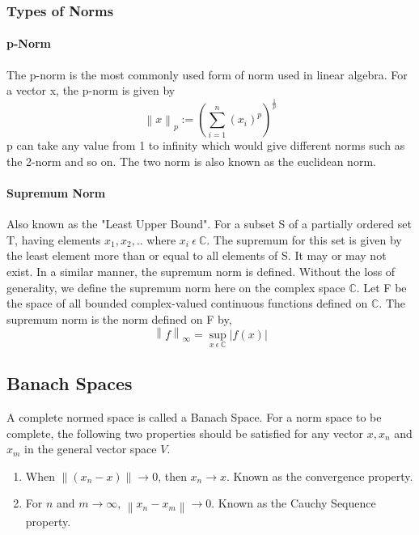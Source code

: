 \documentclass[a4paper,12pt]{article}
\newcommand\norm[1]{\left\lVert#1\right\rVert}
\begin{document}
		\subsubsection{Types of Norms}
			\paragraph{p-Norm} The p-norm is the most commonly used form of norm used in linear algebra. For a vector x, the p-norm is given by
				\begin{equation}
					\norm{x}_{p} := \left(\sum\limits_{i=1}^n  (x_{i})^{p}\right)^{\frac{1}{p}}
				\end{equation}
				p can take any value from 1 to infinity which would give different norms such as the 2-norm and so on. The two norm is also known as the euclidean norm.
			\paragraph{Supremum Norm} Also known as the "Least Upper Bound". For a subset S of a partially ordered set T, having elements ${x_{1},x_{2},..}$ where $x_{i}\:\epsilon \:\mathbb{C}$. The supremum for this set is given by the least element more than or equal to all elements of S. It may or may not exist. In a similar manner, the supremum norm is defined. Without the loss of generality, we define the supremum norm here on the complex space $\mathbb{C}$. Let F be the space of all bounded complex-valued continuous functions defined on $\mathbb{C}$. The supremum norm is the norm defined on F by,
			\begin{equation}
				\norm{f}_{\infty}=\sup_{x\: \epsilon \:\mathbb{C}} |f(x)|
			\end{equation}
		
	\subsection{Banach Spaces}
	A complete normed space is called a Banach Space. For a norm space to be complete, the following two properties should be satisfied for any vector $x, x_{n}$ and $x_{m}$ in the general vector space $V$.
		\begin{enumerate}
			\item When $\norm{(x_{n} -x)}\rightarrow 0$, then $x_{n} \rightarrow x$. Known as the convergence property.
			\item For $n$ and $m \rightarrow \infty$, $\norm{x_{n}-x_{m}} \rightarrow 0$. Known as the Cauchy Sequence property.
		\end{enumerate}
	
\end{document}
